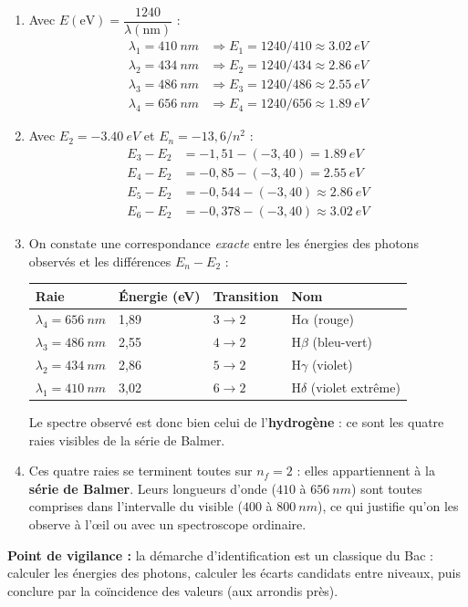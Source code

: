 \documentclass[11pt]{article}
\begin{document}
\begin{corrige}
\begin{enumerate}
\item Avec $E(\text{eV}) = \dfrac{1240}{\lambda(\text{nm})}$ :
\begin{align*}
\lambda_1 = \SI{410}{nm} &\Rightarrow E_1 = 1240/410 \approx \SI{3,02}{eV} \\
\lambda_2 = \SI{434}{nm} &\Rightarrow E_2 = 1240/434 \approx \SI{2,86}{eV} \\
\lambda_3 = \SI{486}{nm} &\Rightarrow E_3 = 1240/486 \approx \SI{2,55}{eV} \\
\lambda_4 = \SI{656}{nm} &\Rightarrow E_4 = 1240/656 \approx \SI{1,89}{eV}
\end{align*}
\item Avec $E_2 = -\SI{3,40}{eV}$ et $E_n = -13,6/n^2$ :
\begin{align*}
E_3 - E_2 &= -1,51 - (-3,40) = \SI{1,89}{eV} \\
E_4 - E_2 &= -0,85 - (-3,40) = \SI{2,55}{eV} \\
E_5 - E_2 &= -0,544 - (-3,40) \approx \SI{2,86}{eV} \\
E_6 - E_2 &= -0,378 - (-3,40) \approx \SI{3,02}{eV}
\end{align*}
\item On constate une correspondance \emph{exacte} entre les énergies des photons observés et les différences $E_n - E_2$ :
\begin{center}
\begin{tabularx}{\linewidth}{|l|X|X|X|}\hline
\rowcolor{popblueL}
\textbf{Raie} & \textbf{Énergie (eV)} & \textbf{Transition} & \textbf{Nom} \\ \hline
$\lambda_4 = \SI{656}{nm}$ & 1,89 & $3 \to 2$ & H$\alpha$ (rouge) \\ \hline
$\lambda_3 = \SI{486}{nm}$ & 2,55 & $4 \to 2$ & H$\beta$ (bleu-vert) \\ \hline
$\lambda_2 = \SI{434}{nm}$ & 2,86 & $5 \to 2$ & H$\gamma$ (violet) \\ \hline
$\lambda_1 = \SI{410}{nm}$ & 3,02 & $6 \to 2$ & H$\delta$ (violet extrême) \\ \hline
\end{tabularx}
\end{center}
Le spectre observé est donc bien celui de l'\textbf{hydrogène} : ce sont les quatre raies visibles de la série de Balmer.
\item Ces quatre raies se terminent toutes sur $n_f = 2$ : elles appartiennent à la \textbf{série de Balmer}. Leurs longueurs d'onde ($410$ à $\SI{656}{nm}$) sont toutes comprises dans l'intervalle du visible ($400$ à $\SI{800}{nm}$), ce qui justifie qu'on les observe à l'œil ou avec un spectroscope ordinaire.
\end{enumerate}
\textbf{Point de vigilance :} la démarche d'identification est un classique du Bac : calculer les énergies des photons, calculer les écarts candidats entre niveaux, puis conclure par la coïncidence des valeurs (aux arrondis près).
\end{corrige}
\end{document}
